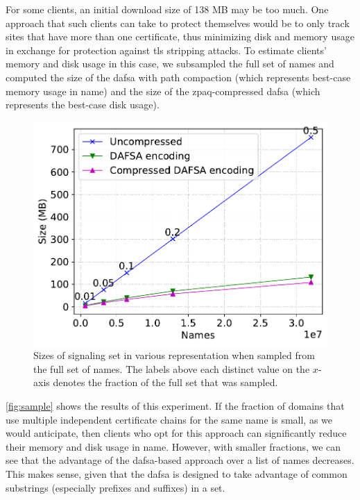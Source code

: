 For some clients, an initial download size of 138 MB may be too much. One
approach that such clients can take to protect themselves would be to only track
sites that have more than one certificate, thus minimizing disk and memory usage
in exchange for protection against \ac{tls} stripping attacks. To estimate
clients' memory and disk usage in this case, we subsampled the full set of names
and computed the size of the \ac{dafsa} with path compaction (which represents
best-case memory usage in \ac{name}) and the size of the zpaq-compressed
\ac{dafsa} (which represents the best-case disk usage).

\begin{figure}[t]
  \centering
  \includegraphics[width=\linewidth]{fig/sample}
  \caption{Sizes of signaling set in various representation when sampled from
  the full set of names. The labels above each distinct value on the $x$-axis
  denotes the fraction of the full set that was sampled.}
  \label{fig:sample}
\end{figure}

\autoref{fig:sample} shows the results of this experiment. If the fraction of
domains that use multiple independent certificate chains for the same name is
small, as we would anticipate, then clients who opt for this approach can
significantly reduce their memory and disk usage in \ac{name}. However, with
smaller fractions, we can see that the advantage of the \ac{dafsa}-based
approach over a list of names decreases. This makes sense, given that the
\ac{dafsa} is designed to take advantage of common substrings (especially
prefixes and suffixes) in a set.

